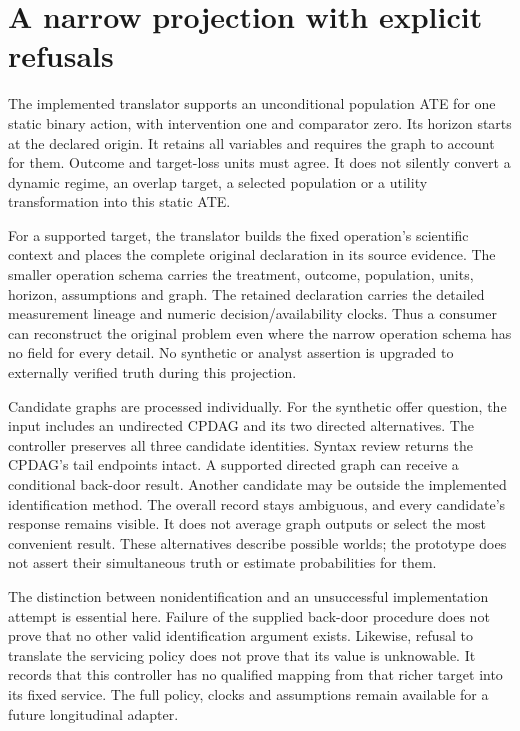 \section{A narrow projection with explicit refusals}

The implemented translator supports an unconditional population ATE for one
static binary action, with intervention one and comparator zero. Its horizon
starts at the declared origin. It retains all variables and requires the graph
to account for them. Outcome and target-loss units must agree. It does not
silently convert a dynamic regime, an overlap target, a selected population or
a utility transformation into this static ATE.

For a supported target, the translator builds the fixed operation's scientific
context and places the complete original declaration in its source evidence.
The smaller operation schema carries the treatment, outcome, population, units,
horizon, assumptions and graph. The retained declaration carries the detailed
measurement lineage and numeric decision/availability clocks. Thus a consumer
can reconstruct the original problem even where the narrow operation schema
has no field for every detail. No synthetic or analyst assertion is upgraded to
externally verified truth during this projection.

Candidate graphs are processed individually. For the synthetic offer question,
the input includes an undirected CPDAG and its two directed alternatives. The
controller preserves all three candidate identities. Syntax review returns the
CPDAG's tail endpoints intact. A supported directed graph can receive a
conditional back-door result. Another candidate may be outside the implemented
identification method. The overall record stays ambiguous, and every candidate's
response remains visible. It does not average graph outputs or select the most
convenient result. These alternatives describe possible worlds; the prototype
does not assert their simultaneous truth or estimate probabilities for them.

The distinction between nonidentification and an unsuccessful implementation
attempt is essential here. Failure of the supplied back-door procedure does
not prove that no other valid identification argument exists. Likewise, refusal
to translate the servicing policy does not prove that its value is unknowable.
It records that this controller has no qualified mapping from that richer
target into its fixed service. The full policy, clocks and assumptions remain
available for a future longitudinal adapter.

